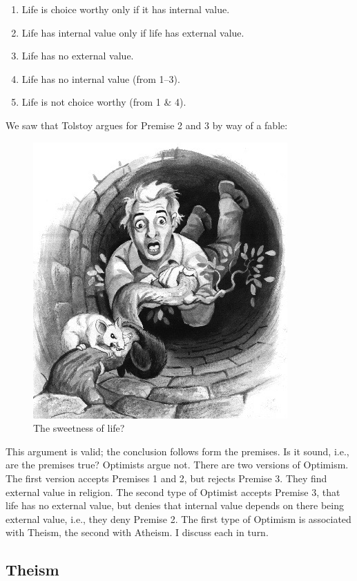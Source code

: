 \documentclass[]{article}
\providecommand{\tightlist}{%
  \setlength{\itemsep}{0pt}\setlength{\parskip}{0pt}}
\begin{document}
\begin{enumerate}
\def\labelenumi{\arabic{enumi}.}
\tightlist
\item
  Life is choice worthy only if it has internal value.
\item
  Life has internal value only if life has external value.
\item
  Life has no external value.
\item
  Life has no internal value (from 1--3).
\item
  Life is not choice worthy (from 1 \& 4).
\end{enumerate}

We saw that Tolstoy argues for Premise 2 and 3 by way of a fable:

\begin{figure}[htbp]
\centering
\includegraphics{Tolstoy.jpg}
\caption{The sweetness of life?}
\end{figure}

This argument is valid; the conclusion follows form the premises. Is it
sound, i.e., are the premises true? Optimists argue not. There are two
versions of Optimism. The first version accepts Premises 1 and 2, but
rejects Premise 3. They find external value in religion. The second type
of Optimist accepts Premise 3, that life has no external value, but
denies that internal value depends on there being external value, i.e.,
they deny Premise 2. The first type of Optimism is associated with
Theism, the second with Atheism. I discuss each in turn.

\subsection{Theism}\label{theism}
\end{document}
